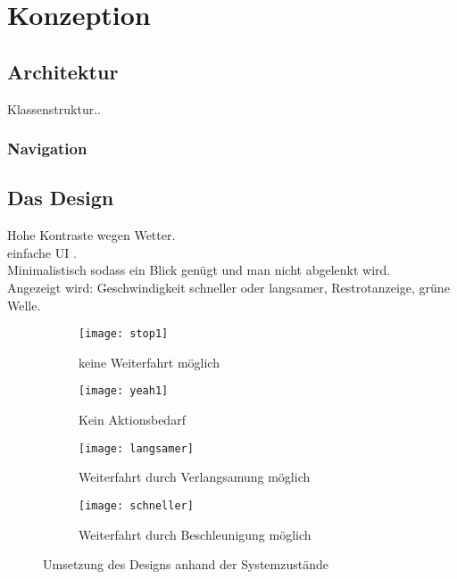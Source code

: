 \chapter{\label{chap:entwurf}Konzeption}
\section{Architektur}
Klassenstruktur..
\subsection{Navigation}
\section{Das Design}
Hohe Kontraste wegen Wetter.\\
einfache UI .\\
Minimalistisch sodass ein Blick genügt und man nicht abgelenkt wird.\\
Angezeigt wird: Geschwindigkeit schneller oder langsamer, 
Restrotanzeige, grüne Welle.
\begin{figure}[H]
        \centering
           \begin{subfigure}[t]{0.23\textwidth}
                \texttt{[image: stop1]}
                \caption[Systemzustand d]{keine Weiterfahrt möglich}
                \label{fig:stop}
        \end{subfigure}
           \hfill 
              \begin{subfigure}[t]{0.23\textwidth}
                \texttt{[image: yeah1]}
                \caption[Systemzustand c]{Kein Aktionsbedarf}
                \label{fig:yeah}
        \end{subfigure}
           \hfill
        \begin{subfigure}[t]{0.23\textwidth}
                \texttt{[image: langsamer]}
                \caption[Systemzustand a]{Weiterfahrt durch Verlangsamung möglich}
                \label{fig:langsamer}
        \end{subfigure}
        \hfill
        \begin{subfigure}[t]{0.23\textwidth}
                \texttt{[image: schneller]}
                \caption[Systemzustand b]{Weiterfahrt durch Beschleunigung möglich}
                \label{fig:schneller}
        \end{subfigure}     
        \caption[Systemzustände im Ampelbereich]{Umsetzung des Designs anhand der Systemzustände}
        \label{fig:mockup}
\end{figure} 
